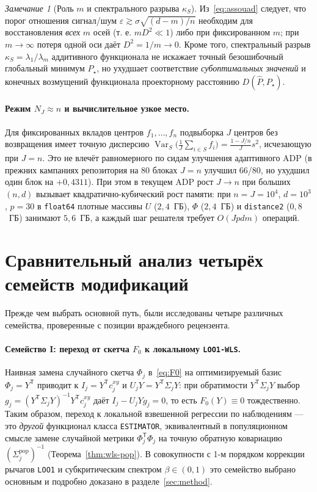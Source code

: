 \documentclass[11pt,a4paper]{article}
\numberwithin{equation}{section}
\theoremstyle{definition}
\theoremstyle{remark}
\newtheorem{remark}[theorem]{Замечание}
\newcommand{\Var}{\operatorname{Var}}
\newcommand{\T}{^{\mathsf T}}
\newcommand{\code}[1]{\nolinkurl{#1}}
\begin{document}
\begin{remark}[Роль $m$ и спектрального разрыва $\kappa_S$]
Из~\eqref{eq:assouad} следует, что порог отношения сигнал/шум $\varepsilon \gtrsim \sigma \sqrt{(d-m)/n}$
необходим для восстановления \emph{всех} $m$ осей (т. е. $m D^2 \ll 1$) либо при фиксированном $m$;
при $m \to \infty$ потеря одной оси даёт $D^2 = 1/m \to 0$.
Кроме того, спектральный разрыв $\kappa_S = \lambda_1 / \lambda_m$ аддитивного функционала не искажает
точный безошибочный глобальный минимум $P_\star$, но ухудшает соответствие \emph{субоптимальных значений}
и конечных возмущений функционала проекторному расстоянию $D(\widehat{P}, P_\star)$.
\end{remark}

\paragraph{Режим $N_J \approx n$ и вычислительное узкое место.}
Для фиксированных вкладов центров $f_1, \dots, f_n$ подвыборка $J$ центров без возвращения имеет точную дисперсию
$\Var_S\!\bigl(\frac{1}{J}\sum_{i\in S} f_i\bigr) = \frac{1 - J/n}{J} s^2$,
исчезающую при $J = n$. Это не влечёт равномерного по сидам улучшения адаптивного ADP
(в прежних кампаниях репозитория на 80 блоках $J = n$ улучшил 66/80, но ухудшил один блок на $+0{,}4311$).
При этом в текущем ADP рост $J \to n$ при больших $(n,d)$ вызывает квадратично-кубический рост памяти:
при $n = J = 10^4$, $d = 10^3$, $p = 30$ в \texttt{float64} плотные массивы $U$ ($2{,}4$~ГБ),
$\Phi$ ($2{,}4$~ГБ) и \code{distance2} ($0{,}8$~ГБ) занимают $5{,}6$~ГБ, а каждый шаг
решателя требует $O(J p d m)$ операций.

\section{Сравнительный анализ четырёх семейств модификаций}
\label{sec:families}

Прежде чем выбрать основной путь, были исследованы четыре различных семейства,
проверенные с позиции враждебного рецензента.

\paragraph{Семейство I: переход от скетча $F_0$ к локальному \texttt{LOO1-WLS}.}
Наивная замена случайного скетча $\Phi_j$ в~\eqref{eq:F0} на оптимизируемый базис $\Phi_j = Y\T$
приводит к $I_j = Y\T c_j^{xy}$ и $U_j Y = Y\T \Sigma_j Y$: при обратимости $Y\T \Sigma_j Y$
выбор $g_j = (Y\T \Sigma_j Y)^{-1} Y\T c_j^{xy}$ даёт $I_j - U_j Y g_j = 0$, то есть
$F_0(Y) \equiv 0$ тождественно. Таким образом, переход к локальной взвешенной регрессии по
наблюдениям — это \emph{другой} функционал класса \texttt{ESTIMATOR}, эквивалентный в
популяционном смысле замене случайной метрики $\Phi_j\T \Phi_j$ на точную обратную
ковариацию $(\Sigma_j^{\mathrm{pop}})^{-1}$ (Теорема~\ref{thm:wls-pop}).
В совокупности с 1-м порядком коррекции рычагов \texttt{LOO1} и субкритическим спектром
$\beta \in (0,1)$ это семейство выбрано основным и подробно доказано в разделе~\ref{sec:method}.
\end{document}
